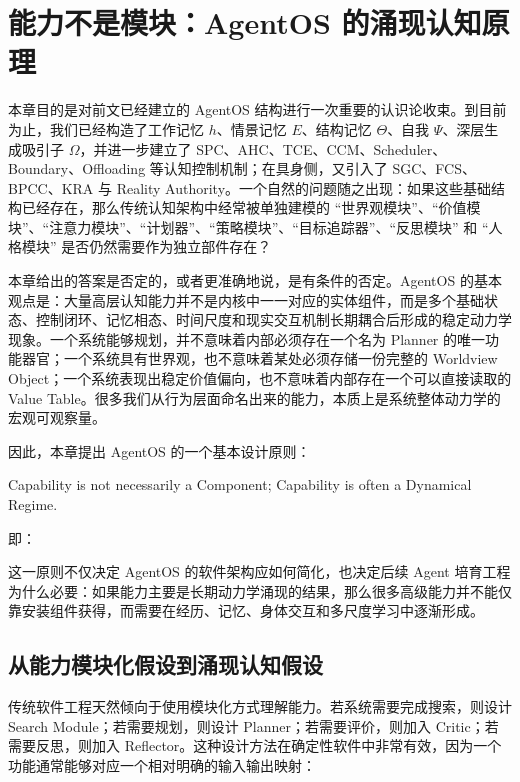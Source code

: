 \chapter{能力不是模块：AgentOS 的涌现认知原理}
\label{chap:emergent-cognition}

本章目的是对前文已经建立的 AgentOS 结构进行一次重要的认识论收束。到目前为止，我们已经构造了工作记忆 $h$、情景记忆 $E$、结构记忆 $\Theta$、自我 $\Psi$、深层生成吸引子 $\Omega$，并进一步建立了 SPC、AHC、TCE、CCM、Scheduler、Boundary、Offloading 等认知控制机制；在具身侧，又引入了 SGC、FCS、BPCC、KRA 与 Reality Authority。一个自然的问题随之出现：如果这些基础结构已经存在，那么传统认知架构中经常被单独建模的 ``世界观模块''、``价值模块''、``注意力模块''、``计划器''、``策略模块''、``目标追踪器''、``反思模块'' 和 ``人格模块'' 是否仍然需要作为独立部件存在？

本章给出的答案是否定的，或者更准确地说，是有条件的否定。AgentOS 的基本观点是：大量高层认知能力并不是内核中一一对应的实体组件，而是多个基础状态、控制闭环、记忆相态、时间尺度和现实交互机制长期耦合后形成的稳定动力学现象。一个系统能够规划，并不意味着内部必须存在一个名为 Planner 的唯一功能器官；一个系统具有世界观，也不意味着某处必须存储一份完整的 Worldview Object；一个系统表现出稳定价值偏向，也不意味着内部存在一个可以直接读取的 Value Table。很多我们从行为层面命名出来的能力，本质上是系统整体动力学的宏观可观察量。

因此，本章提出 AgentOS 的一个基本设计原则：

\begin{chapterlead}
Capability is not necessarily a Component; Capability is often a Dynamical Regime.
\end{chapterlead}

即：

\begin{statementbox}
\centering
{}
\end{statementbox}

这一原则不仅决定 AgentOS 的软件架构应如何简化，也决定后续 Agent 培育工程为什么必要：如果能力主要是长期动力学涌现的结果，那么很多高级能力并不能仅靠安装组件获得，而需要在经历、记忆、身体交互和多尺度学习中逐渐形成。

\section{从能力模块化假设到涌现认知假设}

传统软件工程天然倾向于使用模块化方式理解能力。若系统需要完成搜索，则设计 Search Module；若需要规划，则设计 Planner；若需要评价，则加入 Critic；若需要反思，则加入 Reflector。这种设计方法在确定性软件中非常有效，因为一个功能通常能够对应一个相对明确的输入输出映射：

